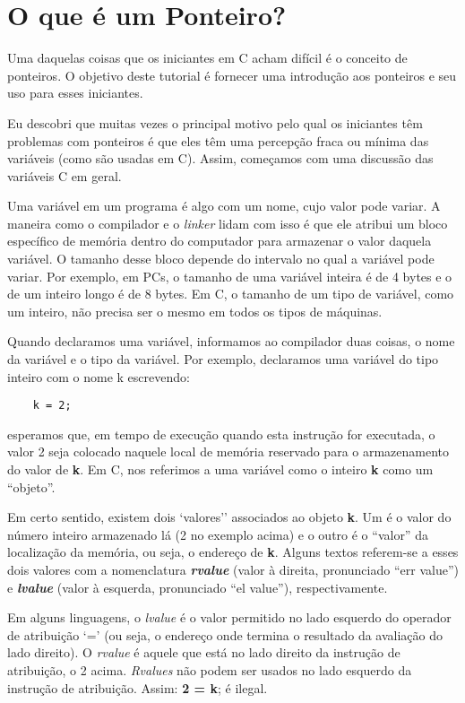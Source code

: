 
\chapter{O que é um Ponteiro?}
Uma daquelas coisas que os iniciantes em C acham difícil é o conceito de ponteiros. O objetivo deste tutorial é fornecer uma introdução aos ponteiros e seu uso para esses iniciantes.

Eu descobri que muitas vezes o principal motivo pelo qual os iniciantes têm problemas com ponteiros é que eles têm uma percepção fraca ou mínima das variáveis (como são usadas em C). Assim, começamos com uma discussão das variáveis C em geral.

Uma variável em um programa é algo com um nome, cujo valor pode variar. A maneira como o compilador e o \textit{linker} lidam com isso é que ele atribui um bloco específico de memória dentro do computador para armazenar o valor daquela variável. O tamanho desse bloco depende do intervalo no qual a variável pode variar. Por exemplo, em PCs, o tamanho de uma variável inteira é de 4 bytes e o de um inteiro longo é de 8 bytes. Em C, o tamanho de um tipo de variável, como um inteiro, não precisa ser o mesmo em todos os tipos de máquinas.

Quando declaramos uma variável, informamos ao compilador duas coisas, o nome da variável e o tipo da variável. Por exemplo, declaramos uma variável do tipo inteiro com o nome k escrevendo:
\begin{lstlisting}
	k = 2;
\end{lstlisting}
esperamos que, em tempo de execução quando esta instrução for executada, o valor 2 seja colocado naquele local de memória reservado para o armazenamento do valor de \textbf{k}. Em C, nos referimos a uma variável como o inteiro \textbf{k} como um ``objeto''.

Em certo sentido, existem dois `valores'' associados ao objeto \textbf{k}. Um é o valor do número inteiro armazenado lá (2 no exemplo acima) e o outro é o ``valor'' da localização da memória, ou seja, o endereço de \textbf{k}. Alguns textos referem-se a esses dois valores com a nomenclatura \textbf{\textit{rvalue}} (valor à direita, pronunciado ``err value'') e \textbf{\textit{lvalue}} (valor à esquerda, pronunciado ``el value''), respectivamente.

Em alguns linguagens, o \textit{lvalue} é o valor permitido no lado esquerdo do operador de atribuição `=' (ou seja, o endereço onde termina o resultado da avaliação do lado direito). O \textit{rvalue} é aquele que está no lado direito da instrução de atribuição, o 2 acima. \textit{Rvalues} não podem ser usados no lado esquerdo da instrução de atribuição. Assim: \textbf{2 = k}; é ilegal.


